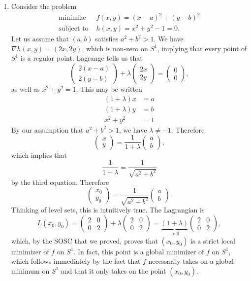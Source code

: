 \documentclass[11pt]{article}
\begin{document}
\begin{enumerate}
\item
Consider the problem
\begin{align*}
\text{minimize } &f(x,y) = (x-a)^2 + (y-b)^2 \\
\text{subject to } &h(x,y) = x^2+y^2-1=0.
\end{align*}
Let us assume that $(a,b)$ satisfies $a^2+b^2>1$. We have $\nabla h(x,y) = (2x,2y)$, which is non-zero on $S^1$, implying that every point of $S^1$ is a regular point. Lagrange tells us that
\[
\begin{pmatrix}
2(x-a) \\ 2(y-b)
\end{pmatrix} + \lambda
\begin{pmatrix}
2x \\ 2y
\end{pmatrix} = \begin{pmatrix}
0\\0
\end{pmatrix},
\]
as well as $x^2+y^2=1$. This may be written
\begin{align*}
(1+\lambda)x &= a \\
(1+\lambda)y &= b \\
x^2+y^2 &= 1
\end{align*}
By our assumption that $a^2+b^2>1$, we have $\lambda \neq -1$. Therefore
\[
\begin{pmatrix}
x \\ y
\end{pmatrix} = \frac{1}{1+\lambda}\begin{pmatrix}
a \\ b
\end{pmatrix},
\]
which implies that
\[
\frac{1}{1+\lambda} = \frac{1}{\sqrt{a^2+b^2}}
\]
by the third equation. Therefore
\[
\begin{pmatrix}
x_0 \\ y_0
\end{pmatrix} = \frac{1}{\sqrt{a^2+b^2}}\begin{pmatrix}
a \\ b
\end{pmatrix}.
\]
Thinking of level sets, this is intuitively true. The Lagrangian is
\[
L(x_0,y_0) = \begin{pmatrix}
2 & 0 \\ 0 & 2
\end{pmatrix} + \lambda \begin{pmatrix}
2 & 0 \\ 0 & 2
\end{pmatrix} = \underbrace{(1+\lambda)}_{>0}\begin{pmatrix}
2 & 0 \\ 0 & 2
\end{pmatrix},
\]
which, by the SOSC that we proved, proves that $(x_0, y_0)$ is a strict local minimizer of $f$ on $S^1$. In fact, this point is a global minimizer of $f$ on $S^1$, which follows immediately by the fact that $f$ necessarily takes on a global minimum on $S^1$ and that it only takes on the point $(x_0,y_0)$.


\end{enumerate}
\end{document}
